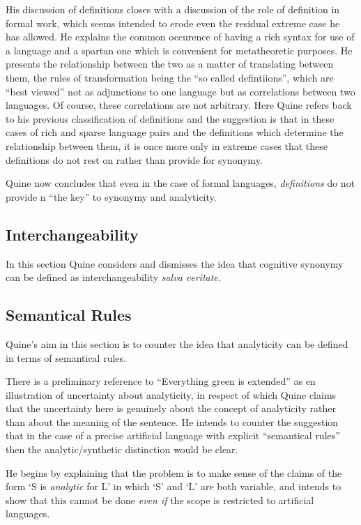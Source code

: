 His discussion of definitions closes with a discussion of the role of definition in formal work, which seems intended to erode even the residual extreme case he has allowed.
He explains the common occurence of having a rich syntax for use of a language and a spartan one which is convenient for metatheoretic purposes.
He presents the relationship between the two as a matter of translating between them, the rules of transformation being the ``so called defintiions'', which are ``best viewed'' not as adjunctions to one language but as correlations between two languages.
Of course, these correlations are not arbitrary.
Here Quine refers back to his previous classification of definitions and the suggestion is that in these cases of rich and sparse language pairs and the definitions which determine the relationship between them, it is once more only in extreme cases that these definitions do not rest on rather than provide for synonymy.

Quine now concludes that even in the case of formal languages, \emph{definitions} do not provide n ``the key'' to synonymy and analyticity.

\subsection{Interchangeability}

In this section Quine considers and dismisses the idea that cognitive synonymy can be defined as interchangeability \emph{salva veritate}.

\subsection{Semantical Rules}

Quine's aim in this section is to counter the idea that analyticity can be defined in terms of semantical rules.

There is a preliminary reference to ``Everything green is extended'' as en illustration of uncertainty about analyticity, in respect of which Quine claims that the uncertainty here is genuinely about the concept of analyticity rather than about the meaning of the sentence.
He intends to counter the suggestion that in the case of a precise artificial language with explicit ``semantical rules'' then the analytic/synthetic distinction would be clear.

He begins by explaining that the problem is to make sense of the claims of the form `S is \emph{analytic} for L' in which `S' and `L' are both variable, and intends to show that this cannot be done \emph{even if} the scope is restricted to artificial languages.


